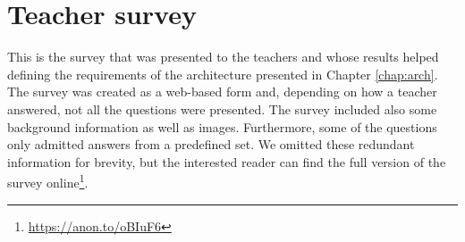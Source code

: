 \chapter{Teacher survey} \label{append:teachsur}
This is the survey that was presented to the teachers and whose results helped defining the requirements of the architecture presented in Chapter \ref{chap:arch}. The survey was created as a web-based form and, depending on how a teacher answered, not all the questions were presented. The survey included also some background information as well as images. Furthermore, some of the questions only admitted answers from a predefined set. We omitted these redundant information for brevity, but the interested reader can find the full version of the survey online\footnote{\url{https://anon.to/oBIuF6}}.


